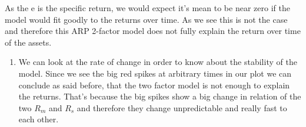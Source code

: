 \documentclass[11pt]{article}
\providecommand{\tightlist}{%
      \setlength{\itemsep}{0pt}\setlength{\parskip}{0pt}}
\begin{document}
    As the e is the specific return, we would expect it's mean to be near
zero if the model would fit goodly to the returns over time. As we see
this is not the case and therefore this ARP 2-factor model does not
fully explain the return over time of the assets.

    \begin{enumerate}
\def\labelenumi{\alph{enumi})}
\setcounter{enumi}{3}
\tightlist
\item
  We can look at the rate of change in order to know about the stability
  of the model. Since we see the big red spikes at arbitrary times in
  our plot we can conclude as said before, that the two factor model is
  not enough to explain the returns. That's because the big spikes show
  a big change in relation of the two \(R_m\) and \(R_s\) and therefore
  they change unpredictable and really fast to each other.
\end{enumerate}
\end{document}
